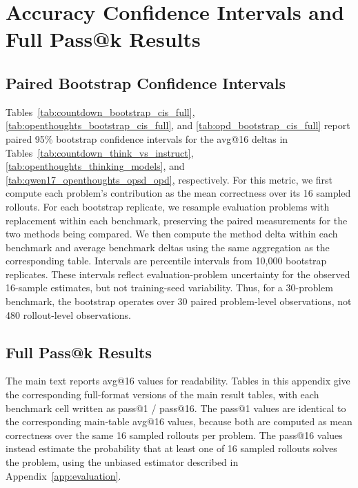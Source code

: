 \section{Accuracy Confidence Intervals and Full Pass@k Results}
\label{app:full-passk-results}

\subsection{Paired Bootstrap Confidence Intervals}
\label{app:bootstrap-cis}

Tables~\ref{tab:countdown_bootstrap_cis_full},
\ref{tab:openthoughts_bootstrap_cis_full}, and
\ref{tab:opd_bootstrap_cis_full} report paired 95\% bootstrap confidence
intervals for the avg@16 deltas in
Tables~\ref{tab:countdown_think_vs_instruct},
\ref{tab:openthoughts_thinking_models}, and
\ref{tab:qwen17_openthoughts_opsd_opd}, respectively. For this metric, we first
compute each problem's contribution as the mean correctness over its 16 sampled
rollouts. For each bootstrap replicate, we
resample evaluation problems with replacement within each benchmark, preserving
the paired measurements for the two methods being compared. We then compute the
method delta within each benchmark and average benchmark deltas using the same
aggregation as the corresponding table. Intervals are percentile intervals from
10,000 bootstrap replicates. These intervals reflect evaluation-problem
uncertainty for the observed 16-sample estimates, but not training-seed
variability. Thus, for a 30-problem benchmark, the bootstrap operates over 30
paired problem-level observations, not 480 rollout-level observations.







\subsection{Full Pass@k Results}

The main text reports avg@16 values for readability. Tables in this appendix
give the corresponding full-format versions of the main result tables, with
each benchmark cell written as pass@1 / pass@16.
The pass@1 values are identical to the corresponding main-table avg@16 values,
because both are computed as mean correctness over the same 16 sampled rollouts
per problem. The pass@16 values instead estimate the probability that at least
one of 16 sampled rollouts solves the problem, using the unbiased estimator
described in Appendix~\ref{app:evaluation}.






